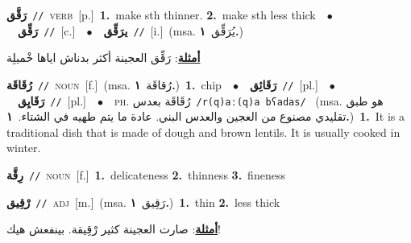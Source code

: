 \documentclass[10pt,a4paper,twoside]{article} %
\begin{document}
\begin{multicols}{2}
{\setlength\topsep{0pt}\textbf{\foreignlanguage{arabic}{رَقَّق}}\ {\color{gray}\texttt{//}\color{black}}\ \textsc{verb}\ [p.]\ \textbf{1.}~make sth thinner.  \textbf{2.}~make sth less thick\ \ $\bullet$\ \ \setlength\topsep{0pt}\textbf{\foreignlanguage{arabic}{رَقِّق}}\ {\color{gray}\texttt{//}\color{black}}\ [c.]\ \ $\bullet$\ \ \setlength\topsep{0pt}\textbf{\foreignlanguage{arabic}{يرَقِّق}}\ {\color{gray}\texttt{//}\color{black}}\ [i.]\ \color{gray}(msa. \foreignlanguage{arabic}{يُرَقِّق}~\foreignlanguage{arabic}{\textbf{١.}})\color{black}\  \begin{flushright}\color{gray}\foreignlanguage{arabic}{\textbf{\underline{\foreignlanguage{arabic}{أمثلة}}}: رَقِّق العجينة أكثر بدناش اياها خْميلِة}\end{flushright}\color{black}} \vspace{2mm}

{\setlength\topsep{0pt}\textbf{\foreignlanguage{arabic}{رُقَاقَة}}\ {\color{gray}\texttt{//}\color{black}}\ \textsc{noun}\ [f.]\ \color{gray}(msa. \foreignlanguage{arabic}{رُقاقَة}~\foreignlanguage{arabic}{\textbf{١.}})\color{black}\ \textbf{1.}~chip\ \ $\bullet$\ \ \setlength\topsep{0pt}\textbf{\foreignlanguage{arabic}{رَقَائِق}}\ {\color{gray}\texttt{//}\color{black}}\ [pl.]\ \ $\bullet$\ \ \setlength\topsep{0pt}\textbf{\foreignlanguage{arabic}{رَقَايِق}}\ {\color{gray}\texttt{//}\color{black}}\ [pl.]\ \ $\bullet$\ \ \textsc{ph.} \color{gray} \foreignlanguage{arabic}{رُقَاقَة بعدس}\color{black}\ {\color{gray}\texttt{/{\sffamily r(q)aː(q)a bʕadas}/}\color{black}}\ \color{gray} (msa. \foreignlanguage{arabic}{هو طبق تقليدي مصنوع من العجين والعدس البني. عادة ما يتم طهيه في الشتاء.}~\foreignlanguage{arabic}{\textbf{١.}})\color{black}\ \textbf{1.}~It is a traditional dish that is made of dough and brown lentils. It is usually cooked in winter.\ } \vspace{2mm}

{\setlength\topsep{0pt}\textbf{\foreignlanguage{arabic}{رِقَّة}}\ {\color{gray}\texttt{//}\color{black}}\ \textsc{noun}\ [f.]\ \textbf{1.}~delicateness  \textbf{2.}~thinness  \textbf{3.}~fineness\ } \vspace{2mm}

{\setlength\topsep{0pt}\textbf{\foreignlanguage{arabic}{رْقِيق}}\ {\color{gray}\texttt{//}\color{black}}\ \textsc{adj}\ [m.]\ \color{gray}(msa. \foreignlanguage{arabic}{رَقِيق}~\foreignlanguage{arabic}{\textbf{١.}})\color{black}\ \textbf{1.}~thin  \textbf{2.}~less thick\  \begin{flushright}\color{gray}\foreignlanguage{arabic}{\textbf{\underline{\foreignlanguage{arabic}{أمثلة}}}: صارت العجينة كثير رْقِيقة. بينفعش هيك!}\end{flushright}\color{black}} \vspace{2mm}


\end{multicols}
\end{document}
